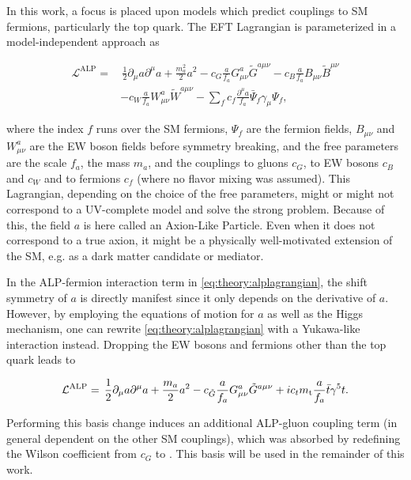 In this work, a focus is placed upon models which predict couplings to SM fermions, particularly the top quark. The EFT Lagrangian is parameterized in a model-independent approach as~\cite{Georgi:1986df}

\begin{equation}
\begin{split}
\label{eq:theory:alplagrangian}
    \mathcal{L}^{\mathrm{ALP}} =& \, \frac{1}{2} \partial_\mu a \partial^\mu a
    + \frac{m_a^2}{2} a^2
    - c_G \frac{a}{f_a} G^{a}_{\mu \nu} \tilde{G}^{a \mu \nu}
    - c_B \frac{a}{f_a} B_{\mu \nu} \tilde{B}^{\mu \nu} \\
    & - c_W \frac{a}{f_a} W^{a}_{\mu \nu} \tilde{W}^{a \mu \nu}
    - \sum_f c_f \frac{\partial^\mu a}{f_a} \bar{\Psi}_f \gamma_\mu \Psi_f ,
\end{split}
\end{equation}

\noindent where the index $f$ runs over the SM fermions, $\Psi_f$ are the fermion fields, $B_{\mu \nu}$ and $W^{a}_{\mu \nu}$ are the EW boson fields before symmetry breaking, and the free parameters are the scale $f_a$, the mass $m_a$, and the couplings to gluons $c_G$, to EW bosons $c_B$ and $c_W$ and to fermions $c_f$ (where no flavor mixing was assumed). This Lagrangian, depending on the choice of the free parameters, might or might not correspond to a UV-complete model and solve the strong \CP problem. Because of this, the field $a$ is here called an Axion-Like Particle. Even when it does not correspond to a true axion, it might be a physically well-motivated extension of the SM, e.g. as a dark matter candidate or mediator.

In the ALP-fermion interaction term in \cref{eq:theory:alplagrangian}, the shift symmetry of $a$ is directly manifest since it only depends on the derivative of $a$. However, by employing the equations of motion for $a$ as well as the Higgs mechanism, one can rewrite \cref{eq:theory:alplagrangian} with a Yukawa-like interaction instead. Dropping the EW bosons and fermions other than the top quark leads to

\begin{equation}
\label{eq:theory:alplagrangian2}
    \mathcal{L}^{\mathrm{ALP}} = \, \frac{1}{2} \partial_\mu a \partial^\mu a
    + \frac{m_a}{2} a^2
    - c_{\tilde{G}} \frac{a}{f_a} G^{a}_{\mu \nu} \tilde{G}^{a \mu \nu}
    + i c_t m_{\mathrm{t}} \frac{a}{f_a} \bar{t} \gamma^5 t .
\end{equation}

Performing this basis change induces an additional ALP-gluon coupling term (in general dependent on the other SM couplings), which was absorbed by redefining the Wilson coefficient from $c_G$ to \cG. This basis will be used in the remainder of this work. 

